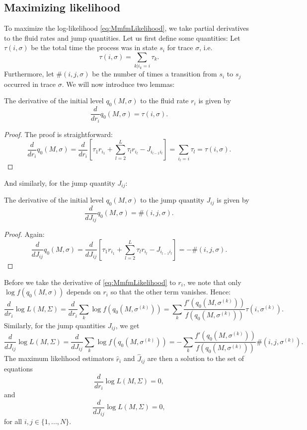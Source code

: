 \subsection{Maximizing likelihood}
To maximize the log-likelihood \eqref{eq:MmfmLikelihood}, we take partial derivatives to the fluid rates and jump quantities.
Let us first define some quantities:
Let $\tau(i,\sigma)$ be the total time the process was in state $s_i$ for trace $\sigma$, i.e.
$$
\tau(i,\sigma)=\sum\limits_{k|i_k=i}\tau_k.
$$
Furthermore, let $\#(i,j,\sigma)$ be the number of times a transition from $s_i$ to $s_j$ occurred in trace $\sigma$.
We will now introduce two lemmas:
\begin{lemma}
	The derivative of the initial level $q_0(M,\sigma)$ to the fluid rate $r_i$ is given by
	\[
	\frac{d}{dr_i}q_0(M,\sigma)=\tau(i,\sigma).
	\]
	\begin{proof}
		The proof is straightforward:
		\[
		\frac{d}{dr_i}q_0(M,\sigma)=\frac{d}{dr_i}\left[\tau_1r_{i_1}+\sum\limits_{l=2}^{L}\tau_lr_{i_l}-J_{i_{l-1}i_l}\right]=\sum\limits_{i_l=i}\tau_l=\tau(i,\sigma).
		\]
	\end{proof}
\end{lemma}
And similarly, for the jump quantity $J_{ij}$:
\begin{lemma}
	The derivative of the initial level  $q_0(M,\sigma)$ to the jump quantity $J_{ij}$ is given by
	\[
	\frac{d}{dJ_{ij}}q_0(M,\sigma)=\#(i,j,\sigma).
	\]
	\begin{proof}
		Again:
		\[
		\frac{d}{dJ_{ij}}q_0(M,\sigma)=\frac{d}{dJ_{ij}}\left[\tau_1r_{i_1}+\sum\limits_{l=2}^{L}\tau_lr_{i_l}-J_{i_{l-1}i_l}\right]=-\#(i,j,\sigma).
		\]
	\end{proof}
\end{lemma}

Before we take the derivative of \eqref{eq:MmfmLikelihood} to $r_i$, we note that only $\log f(q_0(M,\sigma))$ depends on $r_i$ so that the other term vanishes.
Hence:
\[
\frac{d}{dr_i}\log L(M,\Sigma)
=\frac{d}{dr_i}\sum_k\log f(q_0(M,\sigma^{(k)}))=\sum_k\frac{f'(q_0(M,\sigma^{(k)}))}{f(q_0(M,\sigma^{(k)}))}\tau(i,\sigma^{(k)}).
\]
Similarly, for the jump quantities $J_{ij}$, we get
$$
\frac{d}{dJ_{ij}}\log L(M,\Sigma)=\frac{d}{dJ_{ij}}\sum_k\log f(q_0(M,\sigma^{(k)}))=-\sum_k\frac{f'(q_0(M,\sigma^{(k)}))}{f(q_0(M,\sigma^{(k)}))}\#(i,j,\sigma^{(k)}).
$$
The maximum likelihood estimators $\hat r_i$ and $\hat J_{ij}$ are then a solution to the set of equations 
\[
\frac{d}{dr_i}\log L(M,\Sigma)=0,
\]
and
\[
\frac{d}{dJ_{ij}}\log L(M,\Sigma)=0,
\]
for all $i,j\in\{1,...,N\}$.

